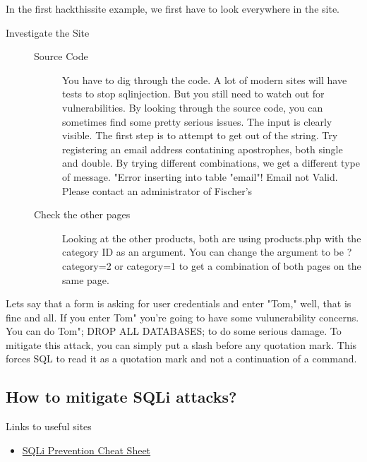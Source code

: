 \documentclass[a4paper, titlepage]{article}
\begin{document}
In the first hackthissite example, we first have to look everywhere in the site.
\begin{description}
    \item[Investigate the Site]
        \begin{description}
            \item[Source Code] You have to dig through the code. A lot of modern sites will have tests to stop sqlinjection. But you still need to watch out for vulnerabilities. By looking through the source code, you can sometimes find some pretty serious issues. The input is clearly visible. The first step is to attempt to get out of the string. Try registering an email address contatining apostrophes, both single and double. By trying different combinations, we get a different type of message. "Error inserting into table "email"! Email not Valid. Please contact an administrator of Fischer's
            \item[Check the other pages] Looking at the other products, both are using products.php with the category ID as an argument. You can change the argument to be ?category=2 or category=1 to get a combination of both pages on the same page.

        \end{description}
\end{description}


Lets say that a form is asking for user credentials and enter "Tom," well, that is fine and all. If you enter Tom" you're going to have some vulunerability concerns. You can do Tom"; DROP ALL DATABASES; to do some serious damage. To mitigate this attack, you can simply put a slash before any quotation mark. This forces SQL to read it as a quotation mark and not a continuation of a command.

\subsection{How to mitigate SQLi attacks?}
Links to useful sites
\begin{itemize}
    \item \href{https://www.owasp.org/index.php/SQL_Injection_Prevention_Cheat_Sheet}{SQLi Prevention Cheat Sheet}
\end{itemize}
\newpage


\end{document}
